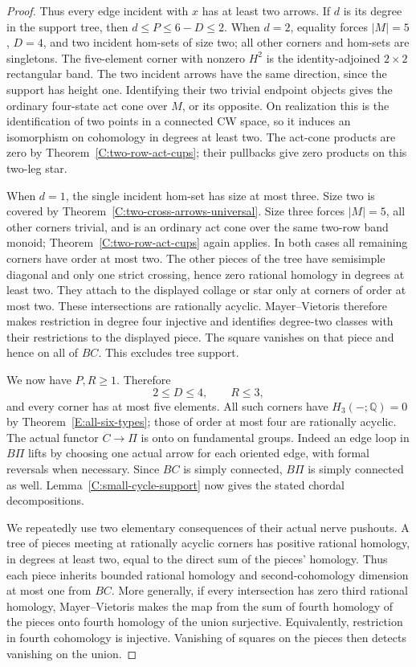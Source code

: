 \begin{proof}
Thus every edge incident with $x$ has at least two arrows.
If $d$ is its degree in the support tree, then
$d\leq P\leq6-D\leq2$.  When $d=2$, equality forces
$|M|=5$, $D=4$, and two incident hom-sets of size two;
all other corners and hom-sets are singletons.  The
five-element corner with nonzero $H^2$ is the
identity-adjoined $2\times2$ rectangular band.  The two
incident arrows have the same direction, since the
support has height one.  Identifying their two trivial
endpoint objects gives the ordinary four-state act
cone over $M$, or its opposite.  On realization this
is the identification of two points in a connected
CW space, so it induces an isomorphism on cohomology
in degrees at least two.  The act-cone products are
zero by Theorem~\ref{C:two-row-act-cups}; their pullbacks
give zero products on this two-leg star.

When $d=1$, the single incident hom-set has size at most
three.  Size two is covered by
Theorem~\ref{C:two-cross-arrows-universal}.  Size three
forces $|M|=5$, all other corners trivial, and is an
ordinary act cone over the same two-row band monoid;
Theorem~\ref{C:two-row-act-cups} again applies.
In both cases all remaining corners have order at most
two.  The other pieces of the tree have semisimple
diagonal and only one strict crossing, hence zero
rational homology in degrees at least two.  They attach
to the displayed collage or star only at corners of
order at most two.  These intersections are rationally
acyclic.  Mayer--Vietoris therefore makes restriction
in degree four injective and identifies degree-two
classes with their restrictions to the displayed piece.
The square vanishes on that piece and hence on all of
$BC$.  This excludes tree support.

We now have $P,R\geq1$.  Therefore
\[
 2\leq D\leq4,\qquad R\leq3,
\]
and every corner has at most five elements.  All such
corners have $H_3(-;\mathbb Q)=0$ by
Theorem~\ref{E:all-six-types}; those of order at most
four are rationally acyclic.
The actual functor $C\to\Pi$ is onto on fundamental
groups.  Indeed an edge loop in $B\Pi$ lifts by choosing
one actual arrow for each oriented edge, with formal
reversals when necessary.  Since $BC$ is simply
connected, $B\Pi$ is simply connected as well.
Lemma~\ref{C:small-cycle-support} now gives the stated
chordal decompositions.

We repeatedly use two elementary consequences of their
actual nerve pushouts.  A tree of pieces meeting at
rationally acyclic corners has positive rational
homology, in degrees at least two, equal to the direct
sum of the pieces' homology.  Thus each piece inherits
bounded rational homology and second-cohomology
dimension at most one from $BC$.  More generally, if
every intersection has zero third rational homology,
Mayer--Vietoris makes the map from the sum of fourth
homology of the pieces onto fourth homology of the
union surjective.  Equivalently, restriction in fourth
cohomology is injective.  Vanishing of squares on the
pieces then detects vanishing on the union.


\end{proof}
